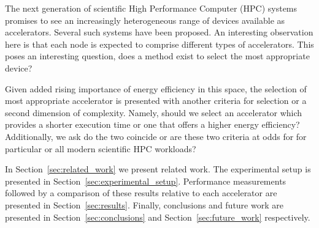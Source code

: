 \documentclass[../document.tex]{subfiles}
\begin{document}
\label{sec:introduction}

The next generation of scientific High Performance Computer (HPC) systems promises to see an increasingly heterogeneous range of devices available as accelerators.
Several such systems have been proposed. 
An interesting observation here is that each node is expected to comprise different types of accelerators.
This poses an interesting question, does a method exist to select the most appropriate device?


Given added rising importance of energy efficiency in this space, the selection of most appropriate accelerator is presented with another criteria for selection or a second dimension of complexity.
Namely, should we select an accelerator which provides a shorter execution time or one that offers a higher energy efficiency?
Additionally, we ask do the two coincide or are these two criteria at odds for for particular or all modern scientific HPC workloads?

In Section~\ref{sec:related_work} we present related work.
The experimental setup is presented in Section~\ref{sec:experimental_setup}.
Performance measurements followed by a comparison of these results relative to each accelerator are presented in Section~\ref{sec:results}.
Finally, conclusions and future work are presented in Section~\ref{sec:conclusions} and Section~\ref{sec:future_work} respectively.
\end{document}
